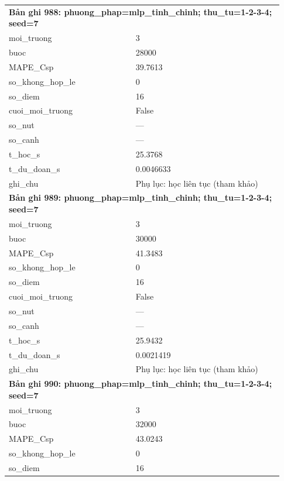 \begin{longtable}{p{0.43\linewidth}p{0.50\linewidth}}
\midrule
\multicolumn{2}{p{0.95\linewidth}}{\textbf{Bản ghi 988: phuong\_phap=mlp\_tinh\_chinh; thu\_tu=1-2-3-4; seed=7}} \\
moi\_\allowbreak truong & 3 \\
buoc & 28000 \\
MAPE\_\allowbreak Csp & 39.7613 \\
so\_\allowbreak khong\_\allowbreak hop\_\allowbreak le & 0 \\
so\_\allowbreak diem & 16 \\
cuoi\_\allowbreak moi\_\allowbreak truong & False \\
so\_\allowbreak nut & — \\
so\_\allowbreak canh & — \\
t\_\allowbreak hoc\_\allowbreak s & 25.3768 \\
t\_\allowbreak du\_\allowbreak doan\_\allowbreak s & 0.0046633 \\
ghi\_\allowbreak chu & Phụ lục: học liên tục (tham khảo) \\
\midrule
\multicolumn{2}{p{0.95\linewidth}}{\textbf{Bản ghi 989: phuong\_phap=mlp\_tinh\_chinh; thu\_tu=1-2-3-4; seed=7}} \\
moi\_\allowbreak truong & 3 \\
buoc & 30000 \\
MAPE\_\allowbreak Csp & 41.3483 \\
so\_\allowbreak khong\_\allowbreak hop\_\allowbreak le & 0 \\
so\_\allowbreak diem & 16 \\
cuoi\_\allowbreak moi\_\allowbreak truong & False \\
so\_\allowbreak nut & — \\
so\_\allowbreak canh & — \\
t\_\allowbreak hoc\_\allowbreak s & 25.9432 \\
t\_\allowbreak du\_\allowbreak doan\_\allowbreak s & 0.0021419 \\
ghi\_\allowbreak chu & Phụ lục: học liên tục (tham khảo) \\
\midrule
\multicolumn{2}{p{0.95\linewidth}}{\textbf{Bản ghi 990: phuong\_phap=mlp\_tinh\_chinh; thu\_tu=1-2-3-4; seed=7}} \\
moi\_\allowbreak truong & 3 \\
buoc & 32000 \\
MAPE\_\allowbreak Csp & 43.0243 \\
so\_\allowbreak khong\_\allowbreak hop\_\allowbreak le & 0 \\
so\_\allowbreak diem & 16 \\

\end{longtable}
